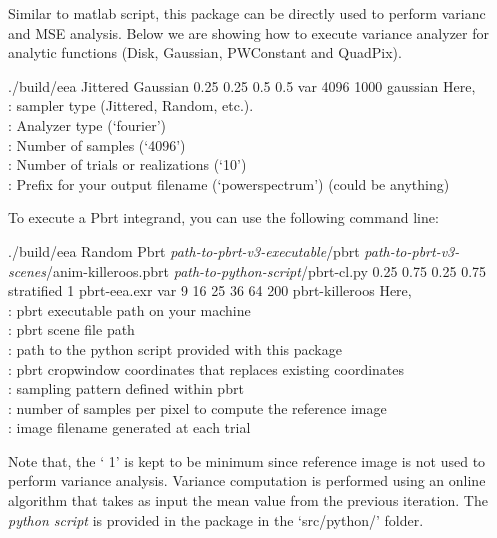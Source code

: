 Similar to matlab script, this package can be directly used to perform varianc and MSE analysis. 
Below we are showing how to execute variance analyzer for analytic functions (Disk, Gaussian, PWConstant and QuadPix).  
%
\begin{tcolorbox}
./build/eea   Jittered   Gaussian  0.25 0.25  0.5 0.5   var  4096  1000    gaussian
\tcblower
Here, \\
: sampler type (Jittered, Random, etc.). \\
:  Analyzer type (`fourier') \\
: Number of samples (`4096') \\
: Number of trials or realizations (`10') \\
: Prefix for your output filename (`powerspectrum') (could be anything)
\end{tcolorbox}
%
To execute a Pbrt integrand, you can use the following command line:
%
\begin{tcolorbox}
./build/eea   Random 
  Pbrt 
 \emph{path-to-pbrt-v3-executable}/pbrt 
 \emph{path-to-pbrt-v3-scenes}/anim-killeroos.pbrt 
 \emph{path-to-python-script}/pbrt-cl.py 
 0.25 0.75 0.25 0.75 
 stratified
 1
 pbrt-eea.exr 
  var  9 16 25 36 64  200 
  pbrt-killeroos
\tcblower
Here, \\
: pbrt executable path on your machine \\
: pbrt scene file path \\
: path to the python script provided with this package \\
: pbrt cropwindow coordinates that replaces existing coordinates \\
: sampling pattern defined within pbrt \\
: number of samples per pixel to compute the reference image \\
: image filename generated at each trial 
\end{tcolorbox}
%
Note that, the ` 1' is kept to be minimum since reference image is not used to perform 
variance analysis. Variance computation is performed using an online algorithm that takes as input 
the mean value from the previous iteration. The \emph{python script} is provided in the package in the `src/python/' folder.
%

